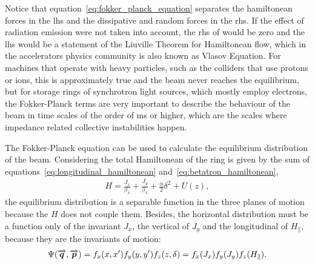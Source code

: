     Notice that equation~\eqref{eq:fokker_planck_equation} separates the hamiltonean forces in the \gls{lhs} and the dissipative and random forces in the \gls{rhs}. If the effect of radiation emission were not taken into account, the \gls{rhs} of would be zero and the \gls{lhs} would be a statement of the Liuville Theorem for Hamiltonean flow, which in the accelerators physics community is also known as Vlasov Equation. For machines that operate with heavy particles, such as the colliders that use protons or ions, this is approximately true and the beam never reaches the equilibrium, but for storage rings of synchrotron light sources, which mostly employ electrons, the Fokker-Planck terms are very important to describe the behaviour of the beam in time scales of the order of \si{\milli\second} or higher, which are the scales where impedance related collective instabilities happen.

    The Fokker-Planck equation can be used to calculate the equilibrium distribution of the beam. Considering the total Hamiltonean of the ring is given by the sum of equations~\eqref{eq:longitudinal_hamiltonean} and~\eqref{eq:betatron_hamiltonean},
    \begin{align}
        H = \frac{J_x}{\beta_x} + \frac{J_y}{\beta_x} + \frac\alpha2\delta^2 + U(z),
    \end{align}
    the equilibrium distribution is a separable function in the three planes of motion because the $H$ does not couple them. Besides, the horizontal distribution must be a function only of the invariant $J_x$, the vertical of $J_y$ and the longitudinal of $H_\parallel$, because they are the invariants of motion:
    \begin{align}
        \Psi(\overrightarrow{\boldsymbol{q}},\overrightarrow{\boldsymbol{p}}) =
        f_x(x,x')f_y(y,y')f_z(z,\delta) =
        f_x(J_x)f_y(J_y)f_z(H_\parallel).
    \end{align}

